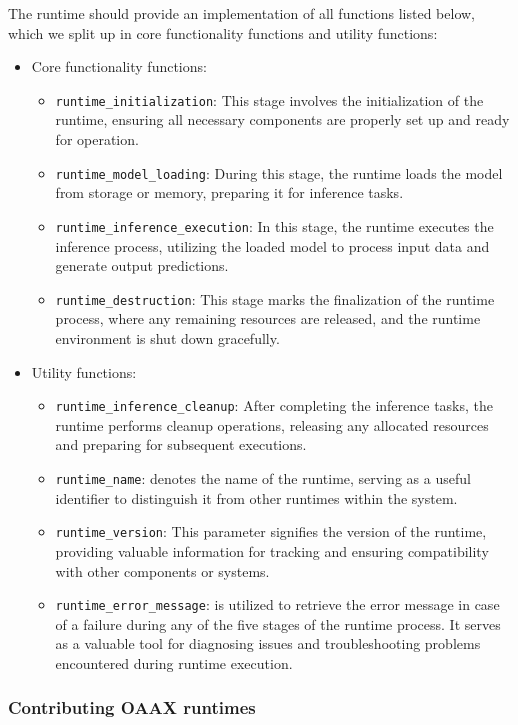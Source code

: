 \documentclass{article}
\begin{document}
The runtime should provide an implementation of all functions listed below, which we split up in core functionality functions and utility functions:
\begin{itemize}
	\item Core functionality functions:
	\begin{itemize}
		\item \texttt{runtime\_initialization}: This stage involves the initialization of the runtime, ensuring all necessary components are properly set up and ready for operation.
		\item \texttt{runtime\_model\_loading}: During this stage, the runtime loads the model from storage or memory, preparing it for inference tasks.
		\item \texttt{runtime\_inference\_execution}: In this stage, the runtime executes the inference process, utilizing the loaded model to process input data and generate output predictions.
            \item \texttt{runtime\_destruction}: This stage marks the finalization of the runtime process, where any remaining resources are released, and the runtime environment is shut down gracefully.
	\end{itemize}
	\item Utility functions:
	\begin{itemize}
            \item \texttt{runtime\_inference\_cleanup}: After completing the inference tasks, the runtime performs cleanup operations, releasing any allocated resources and preparing for subsequent executions.
		\item \texttt{runtime\_name}: denotes the name of the runtime, serving as a useful identifier to distinguish it from other runtimes within the system.
		\item \texttt{runtime\_version}: This parameter signifies the version of the runtime, providing valuable information for tracking and ensuring compatibility with other components or systems.
		\item \texttt{runtime\_error\_message}: is utilized to retrieve the error message in case of a failure during any of the five stages of the runtime process. It serves as a valuable tool for diagnosing issues and troubleshooting problems encountered during runtime execution.
	\end{itemize}
\end{itemize}

\subsubsection{Contributing OAAX runtimes}
\end{document}
